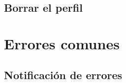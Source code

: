 \documentclass[10pt,letterpaper,extrafontsizes]{memoir}
\begin{document}
\section{Borrar el perfil}

\chapter{Errores comunes}

\section{Notificación de errores}

\backmatter

\pagestyle{index}
\renewcommand{\preindexhook}{%
The first page number is usually, but not always, the primary reference to
the indexed topic.\vskip\onelineskip}
\indexintoc

\printindex

\onecolindex

\pagestyle{empty}
\null\vfil
\end{document}
